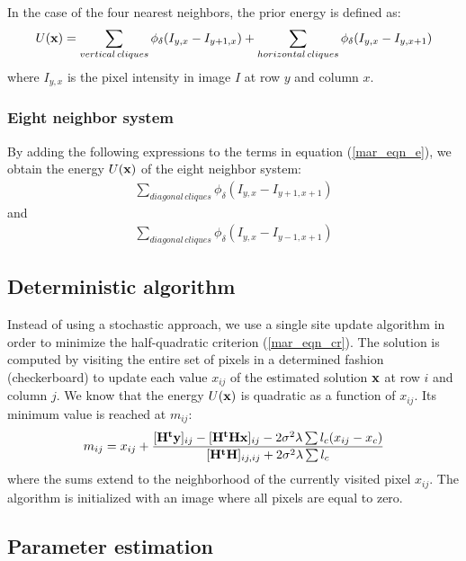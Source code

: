 In the case of the four nearest neighbors, the prior energy is defined as: 
\begin{eqnarray} 
U({\bf x}) = \sum_{vertical\, cliques} \phi_{\delta}(I_{y,x}-I_{y+1,x}) +
\sum_{horizontal\, cliques} \phi_{\delta}(I_{y,x}- I_{y,x+1})
\label{mar_eqn_e}
\end{eqnarray}
where $I_{y,x}$ is the pixel intensity in image $I$ at row $y$ and column $x$.

\subsubsection{Eight neighbor system}

By adding the following expressions to the terms in equation (\ref{mar_eqn_e}), we
obtain the energy $U({\bf x})$ of the eight neighbor system:
\begin{eqnarray} 
\sum_{diagonal\, cliques} \phi_{\delta}(I_{y,x}- I_{y+1,x+1})
\end{eqnarray}
and 
\begin{eqnarray} 
\sum_{diagonal\, cliques} \phi_{\delta}(I_{y,x}- I_{y-1,x+1})
\end{eqnarray}

\subsection{Deterministic algorithm}

Instead of using a stochastic approach, we use a single site update algorithm 
\cite{rest:brette96} in order
to minimize the half-quadratic criterion (\ref{mar_eqn_cr}).
The solution is computed by visiting the entire set of pixels in a determined
fashion (checkerboard) to update each value $x_{ij}$ of the estimated solution
$\bf x$ at row $i$ and column $j$.
We know that the energy $U(\bf x)$ is quadratic as a function of $x_{ij}$.
Its minimum value is reached at $m_{ij}$:
\begin{eqnarray}
m_{ij} = x_{ij} + \frac{[{\bf H^ty}]_{ij} - [{\bf H^tHx}]_{ij} - 2\sigma^2\lambda 
\sum l_c(x_{ij}-x_c)}{[{\bf H^tH}]_{ij,ij} + 2\sigma^2\lambda\sum l_c}
\label{mar_eqn_corr}
\end{eqnarray} 
where the sums extend to the neighborhood of the currently visited pixel $x_{ij}$.
The algorithm is initialized with an image where all pixels are equal to zero.

\subsection{Parameter estimation}

